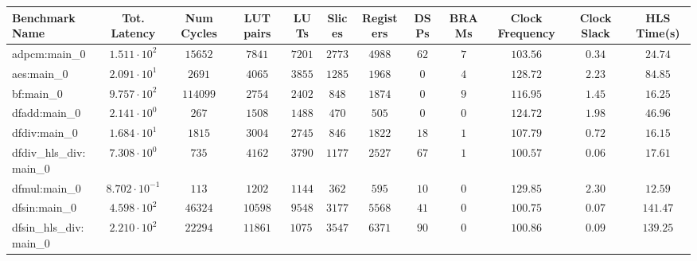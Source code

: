 \begin{tabular}{|l|c|c|c|c|c|c|c|c|c|c|c|}
\hline
Benchmark Name          & Tot. Latency            & Num Cycles & LUT pairs & LUTs      & Slices    & Registers & DSPs    & BRAMs  & Clock Frequency & Clock Slack & HLS Time(s) \\
\hline
adpcm:main\_0           & $ 1.511 \cdot 10^{2}  $ & $ 15652  $ & $ 7841  $ & $ 7201  $ & $ 2773  $ & $ 4988  $ & $ 62  $ & $ 7  $ & $ 103.56      $ & $ 0.34    $ & $ 24.74   $ \\
aes:main\_0             & $ 2.091 \cdot 10^{1}  $ & $ 2691   $ & $ 4065  $ & $ 3855  $ & $ 1285  $ & $ 1968  $ & $ 0   $ & $ 4  $ & $ 128.72      $ & $ 2.23    $ & $ 84.85   $ \\
bf:main\_0              & $ 9.757 \cdot 10^{2}  $ & $ 114099 $ & $ 2754  $ & $ 2402  $ & $ 848   $ & $ 1874  $ & $ 0   $ & $ 9  $ & $ 116.95      $ & $ 1.45    $ & $ 16.25   $ \\
dfadd:main\_0           & $ 2.141 \cdot 10^{0}  $ & $ 267    $ & $ 1508  $ & $ 1488  $ & $ 470   $ & $ 505   $ & $ 0   $ & $ 0  $ & $ 124.72      $ & $ 1.98    $ & $ 46.96   $ \\
dfdiv:main\_0           & $ 1.684 \cdot 10^{1}  $ & $ 1815   $ & $ 3004  $ & $ 2745  $ & $ 846   $ & $ 1822  $ & $ 18  $ & $ 1  $ & $ 107.79      $ & $ 0.72    $ & $ 16.15   $ \\
dfdiv\_hls\_div:main\_0 & $ 7.308 \cdot 10^{0}  $ & $ 735    $ & $ 4162  $ & $ 3790  $ & $ 1177  $ & $ 2527  $ & $ 67  $ & $ 1  $ & $ 100.57      $ & $ 0.06    $ & $ 17.61   $ \\
dfmul:main\_0           & $ 8.702 \cdot 10^{-1} $ & $ 113    $ & $ 1202  $ & $ 1144  $ & $ 362   $ & $ 595   $ & $ 10  $ & $ 0  $ & $ 129.85      $ & $ 2.30    $ & $ 12.59   $ \\
dfsin:main\_0           & $ 4.598 \cdot 10^{2}  $ & $ 46324  $ & $ 10598 $ & $ 9548  $ & $ 3177  $ & $ 5568  $ & $ 41  $ & $ 0  $ & $ 100.75      $ & $ 0.07    $ & $ 141.47  $ \\
dfsin\_hls\_div:main\_0 & $ 2.210 \cdot 10^{2}  $ & $ 22294  $ & $ 11861 $ & $ 10752 $ & $ 3547  $ & $ 6371  $ & $ 90  $ & $ 0  $ & $ 100.86      $ & $ 0.09    $ & $ 139.25  $ \\

\end{tabular}
